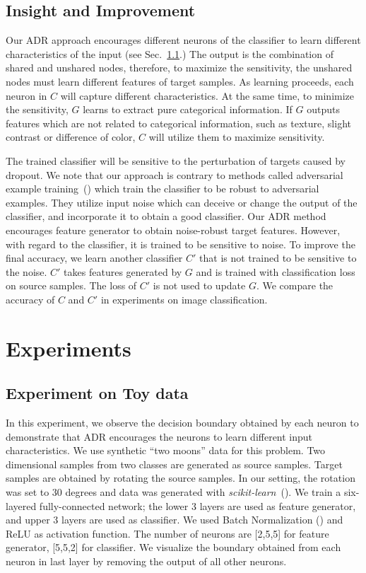 \documentclass{article} \usepackage{iclr2018_conference,times}
\begin{document}
\subsection{Insight and Improvement}\label{insight}
\vspace{-3mm}        
Our ADR approach encourages different neurons of the classifier  to learn different characteristics of the input (see Sec.~\ref{sec:toy}.) 
The output is the combination of shared and unshared nodes, therefore, to maximize the sensitivity, the unshared nodes must learn different features of target samples. As learning proceeds, each neuron in $C$ will capture different characteristics. At the same time, to minimize the sensitivity, $G$ learns to extract pure categorical information. If $G$ outputs features which are not related to categorical information, such as texture, slight contrast or difference of color, $C$ will utilize them to maximize sensitivity.

The trained classifier will be sensitive to the perturbation of targets caused by dropout. We note that our approach is contrary to methods called adversarial example training~(\cite{goodfellow2014explaining,miyato2015distributional}) which train the classifier to be robust to adversarial examples. They utilize input noise which can deceive or change the output of the classifier, and incorporate it to obtain a good classifier. Our ADR method encourages feature generator to obtain noise-robust target features. However, with regard to the classifier, it is trained to be sensitive to noise. To improve the final accuracy, we learn another classifier $C'$ that is not trained to be sensitive to the noise. $C'$ takes features generated by $G$ and is trained with classification loss on source samples. The loss of $C'$ is not used to update $G$. 
We compare the accuracy of $C$ and $C'$ in experiments on image classification.

\section{Experiments}
\subsection{Experiment on Toy data}\label{sec:toy}
\vspace{-3mm}        
 In this experiment, we observe the decision boundary obtained by each neuron to demonstrate that ADR encourages the neurons to learn different input characteristics.
We use synthetic ``two moons'' data for this problem. Two dimensional samples from two classes are generated as source samples. Target samples are obtained by rotating the source samples. In our setting, the rotation was set to 30 degrees and data was generated with {\it scikit-learn}~(\cite{pedregosa2011scikit}). 
We train a six-layered fully-connected network; the lower 3 layers are used as feature generator, and upper 3 layers are used as classifier. We used Batch Normalization (\cite{ioffe2015batch}) and ReLU as activation function. The number of neurons are [2,5,5] for feature generator, [5,5,2] for classifier. We visualize the boundary obtained from each neuron in last layer by removing the output of all other neurons. 
\end{document}
